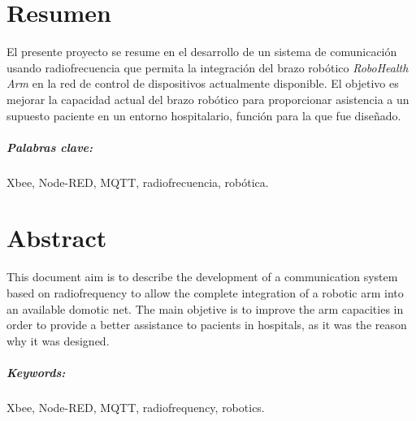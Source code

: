 \chapter{Resumen}

El presente proyecto se resume en el desarrollo de un sistema de comunicación usando radiofrecuencia que permita la integración del brazo robótico \textit{RoboHealth Arm} en la red de control de dispositivos actualmente disponible. El objetivo es mejorar la capacidad actual del brazo robótico para proporcionar asistencia a un supuesto paciente en un entorno hospitalario, función para la que fue diseñado.

\paragraph{Palabras clave:} Xbee, Node-RED, MQTT, radiofrecuencia, robótica.


\chapter{Abstract}

This document aim is to describe the development of a communication system based on radiofrequency to allow the complete integration of a robotic arm into an available domotic net. The main objetive is to improve the arm capacities in order to provide a better assistance to pacients in hospitals, as it was the reason why it was designed.

\paragraph{Keywords:} Xbee, Node-RED, MQTT, radiofrequency, robotics.